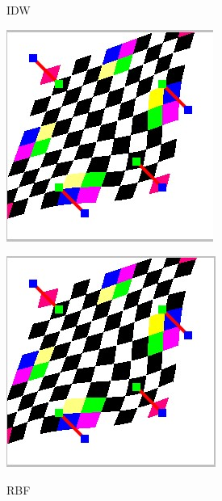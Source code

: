 \documentclass{article}
\begin{document}
	\begin{figure}[htbp]
		\centering
		\begin{minipage}{0.4\linewidth}
			\centering
			\caption{IDW}
			\includegraphics[width=1\linewidth]{IDW2.jpg}
			\label{chutian1}
		\end{minipage}
		\begin{minipage}{0.4\linewidth}
			\centering
			\caption{RBF}
			\includegraphics[width=1\linewidth]{RBF2.jpg}
			\label{chutian2}
		\end{minipage}
	\end{figure}
\end{document}
